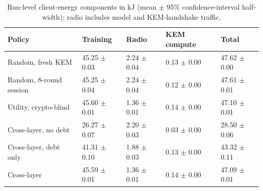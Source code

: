 \begin{table}[!ht]
\caption{Run-level client-energy components in kJ (mean $\pm$ 95\% confidence-interval half-width); radio includes model and KEM-handshake traffic.}
\label{tab:energy-components}
\centering
\setlength{\tabcolsep}{2pt}
\begin{tabular}{|p{}|p{}|p{}|p{}|p{}|}
\hline
Policy & Training & Radio & KEM compute & Total \\
\hline
Random, fresh KEM & 45.25 $\pm$ 0.03 & 2.24 $\pm$ 0.04 & 0.13 $\pm$ 0.00 & 47.62 $\pm$ 0.00 \\
\hline
Random, 8-round session & 45.25 $\pm$ 0.04 & 2.24 $\pm$ 0.04 & 0.12 $\pm$ 0.00 & 47.61 $\pm$ 0.01 \\
\hline
Utility, crypto-blind & 45.60 $\pm$ 0.01 & 1.36 $\pm$ 0.01 & 0.14 $\pm$ 0.00 & 47.10 $\pm$ 0.01 \\
\hline
Cross-layer, no debt & 26.27 $\pm$ 0.07 & 2.20 $\pm$ 0.03 & 0.03 $\pm$ 0.00 & 28.50 $\pm$ 0.06 \\
\hline
Cross-layer, debt only & 41.31 $\pm$ 0.10 & 1.88 $\pm$ 0.03 & 0.13 $\pm$ 0.00 & 43.32 $\pm$ 0.11 \\
\hline
Cross-layer & 45.59 $\pm$ 0.01 & 1.36 $\pm$ 0.01 & 0.14 $\pm$ 0.00 & 47.09 $\pm$ 0.01 \\
\hline
\end{tabular}
\end{table}
